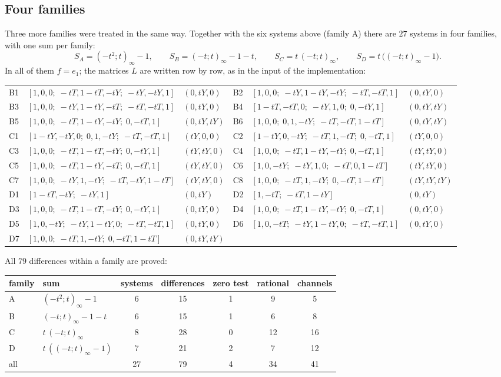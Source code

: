\documentclass[11pt,a4paper]{article}
\theoremstyle{plain}
\theoremstyle{definition}
\theoremstyle{remark}
\begin{document}
\subsection{Four families}\label{sec:families}
Three more families were treated in the same way. Together with the six systems
above (family A) there are $27$ systems in four families, with one sum per family:
\[
  S_A=(-t^2;t)_\infty-1,\qquad S_B=(-t;t)_\infty-1-t,\qquad
  S_C=t\,(-t;t)_\infty,\qquad S_D=t\,\bigl((-t;t)_\infty-1\bigr).
\]
In all of them $f=e_1$; the matrices $L$ are written row by row, as in the input
of the implementation:
\begin{center}
\footnotesize
\begin{tabular}{@{}l@{\ \ }l@{\ \ }l@{\quad}l@{\ \ }l@{\ \ }l@{}}
B1 & $[1,0,0;\;-tT,1-tT,-tY;\;-tY,-tY,1]$ & $(0,tY,0)$ & B2 & $[1,0,0;\;-tY,1-tY,-tY;\;-tT,-tT,1]$ & $(0,tY,0)$ \\
B3 & $[1,0,0;\;-tY,1-tY,-tT;\;-tT,-tT,1]$ & $(0,tY,0)$ & B4 & $[1-tT,-tT,0;\;-tY,1,0;\;0,-tY,1]$ & $(0,tY,tY)$ \\
B5 & $[1,0,0;\;-tT,1-tY,-tY;\;0,-tT,1]$ & $(0,tY,tY)$ & B6 & $[1,0,0;\;0,1,-tY;\;-tT,-tT,1-tT]$ & $(0,tY,tY)$ \\
\addlinespace
C1 & $[1-tY,-tY,0;\;0,1,-tY;\;-tT,-tT,1]$ & $(tY,0,0)$ & C2 & $[1-tY,0,-tY;\;-tT,1,-tT;\;0,-tT,1]$ & $(tY,0,0)$ \\
C3 & $[1,0,0;\;-tT,1-tT,-tY;\;0,-tY,1]$ & $(tY,tY,0)$ & C4 & $[1,0,0;\;-tT,1-tY,-tY;\;0,-tT,1]$ & $(tY,tY,0)$ \\
C5 & $[1,0,0;\;-tT,1-tY,-tT;\;0,-tT,1]$ & $(tY,tY,0)$ & C6 & $[1,0,-tY;\;-tY,1,0;\;-tT,0,1-tT]$ & $(tY,tY,0)$ \\
C7 & $[1,0,0;\;-tY,1,-tY;\;-tT,-tY,1-tT]$ & $(tY,tY,0)$ & C8 & $[1,0,0;\;-tT,1,-tY;\;0,-tT,1-tT]$ & $(tY,tY,tY)$ \\
\addlinespace
D1 & $[1-tT,-tY;\;-tY,1]$ & $(0,tY)$ & D2 & $[1,-tT;\;-tT,1-tY]$ & $(0,tY)$ \\
D3 & $[1,0,0;\;-tT,1-tT,-tY;\;0,-tY,1]$ & $(0,tY,0)$ & D4 & $[1,0,0;\;-tT,1-tY,-tY;\;0,-tT,1]$ & $(0,tY,0)$ \\
D5 & $[1,0,-tY;\;-tY,1-tY,0;\;-tT,-tT,1]$ & $(0,tY,0)$ & D6 & $[1,0,-tT;\;-tY,1-tY,0;\;-tT,-tT,1]$ & $(0,tY,0)$ \\
D7 & $[1,0,0;\;-tT,1,-tY;\;0,-tT,1-tT]$ & $(0,tY,tY)$ & && \\
\end{tabular}
\end{center}
All $79$ differences within a family are proved:
\begin{center}
\begin{tabular}{@{}llccccc@{}}
\toprule
family & sum & systems & differences & zero test & rational & channels\\\midrule
A & $(-t^2;t)_\infty-1$ & 6 & 15 & 1 & 9 & 5\\
B & $(-t;t)_\infty-1-t$ & 6 & 15 & 1 & 6 & 8\\
C & $t\,(-t;t)_\infty$ & 8 & 28 & 0 & 12 & 16\\
D & $t\,((-t;t)_\infty-1)$ & 7 & 21 & 2 & 7 & 12\\\midrule
all & & 27 & 79 & 4 & 34 & 41\\
\bottomrule
\end{tabular}
\end{center}
\end{document}

